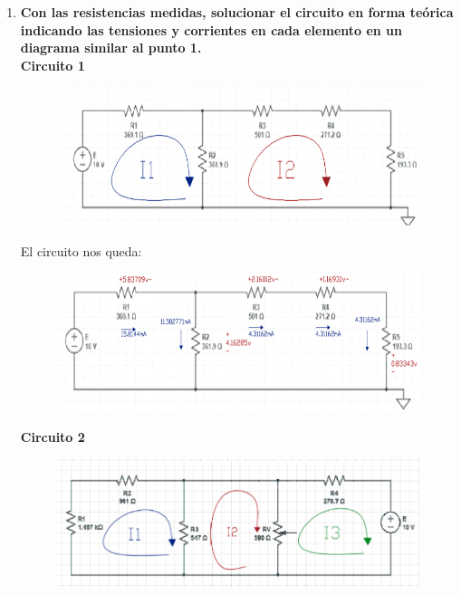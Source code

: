 \documentclass[a4paper,12pt]{report}
\begin{document}
\begin{enumerate}
\newpage
\item \textbf{Con las resistencias medidas, solucionar el circuito en forma teórica indicando las tensiones y corrientes en cada elemento en un diagrama similar al punto 1.}\\
\textbf{Circuito 1}
\begin{figure}[H]
\begin{center}
\includegraphics[scale=0.55]{sergodcirc1,2.png}
\end{center}
\end{figure}
El circuito nos queda:
\begin{figure}[H]
\begin{center}
\includegraphics[scale=0.55]{sergodcirc5,1.png}
\end{center}
\end{figure}
\newpage
\textbf{Circuito 2}
\begin{figure}[H]
\begin{center}
\includegraphics[scale=0.55]{sergodcirc2,2.png}
\end{center}
\end{figure}

\end{enumerate}
\end{document}
